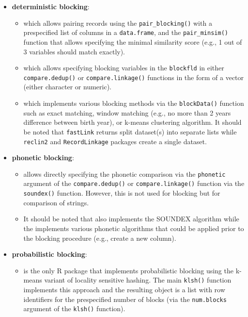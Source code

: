 \begin{itemize}
\item
  \textbf{deterministic blocking}:

  \begin{itemize}
  \tightlist
  \item
     \citep[\citet{reclin2-rjournal}]{reclin2} which allows
    pairing records using the \texttt{pair\_blocking()} with a prespecified
    list of columns in a \texttt{data.frame}, and the \texttt{pair\_minsim()}
    function that allows specifying the minimal similarity score
    (e.g., 1 out of 3 variables should match exactly).
  \item
     \citep[
    \citet{RecordLinkage-rjournal}]{RecordLinkage} which allows specifying blocking
    variables in the \texttt{blockfld} in either \texttt{compare.dedup()} or
    \texttt{compare.linkage()} functions in the form of a vector (either
    character or numeric).
  \item
     \citep[\citet{enamorado2019using}]{fastLink} which
    implements various blocking methods via the \texttt{blockData()}
    function such as exact matching, window matching (e.g., no more
    than 2 years difference between birth year), or k-means
    clustering algorithm. It should be noted that \texttt{fastLink} returns
    split dataset(s) into separate lists while \texttt{reclin2} and
    \texttt{RecordLinkage} packages create a single dataset.
  \end{itemize}
\item
  \textbf{phonetic blocking}:

  \begin{itemize}
  \tightlist
  \item
     allows directly specifying the phonetic
    comparison via the \texttt{phonetic} argument of the \texttt{compare.dedup()}
    or \texttt{compare.linkage()} function via the \texttt{soundex()} function.
    However, this is not used for blocking but for comparison of
    strings.
  \item
    It should be noted that  \citep{stringdist} also
    implements the SOUNDEX algorithm while the 
    \citep[\citet{Phonetic2020}]{phonics} implements various phonetic algorithms
    that could be applied prior to the blocking procedure (e.g.,
    create a new column).
  \end{itemize}
\item
  \textbf{probabilistic blocking}:

  \begin{itemize}
  \tightlist
  \item
     \citep{klsh} is the only R package that implements
    probabilistic blocking using the k-means variant of locality
    sensitive hashing. The main \texttt{klsh()} function implements this
    approach and the resulting object is a list with row identifiers
    for the prespecified number of blocks (via the \texttt{num.blocks}
    argument of the \texttt{klsh()} function).
  \end{itemize}
\end{itemize}

